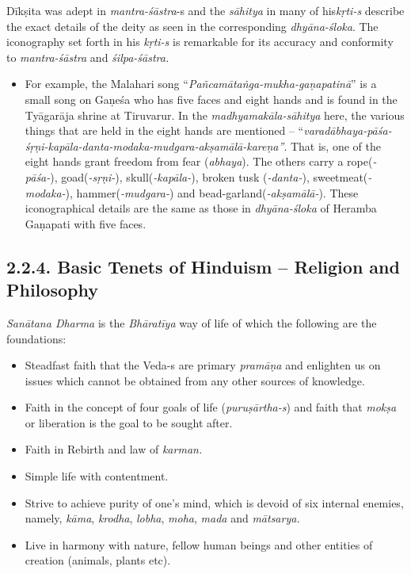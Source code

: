 Dīkṣita was adept in \textit{mantra-śāstra}-s and the \textit{sāhitya} in many of his\break \textit{kṛti-s} describe the exact details of the deity as seen in the corresponding \textit{dhyāna-śloka}. The iconography set forth in his \textit{kṛti-s} is remarkable for its accuracy and conformity to \textit{mantra-śāstra} and \textit{śilpa-śāstra.}

\begin{itemize}
\item For example, the Malahari song “\textit{Pañcamātaṅga-mukha-gaṇapa\-tinā}” is a small song on Gaṇeśa who has five faces and eight hands and is found in the Tyāgarāja shrine at Tiruvarur. In the \textit{madhyamakāla-sāhitya} here, the various things that are held in the eight hands are mentioned – “\textit{varadābhaya-pāśa-śṛṇi-kapāla-danta-modaka-mudgara-akṣamālā-kareṇa”}. That is, one of the eight hands grant freedom from fear (\textit{abhaya}). The others carry a rope(\textit{-pāśa-}), goad(\textit{-sṛṇi-}), skull(\textit{-kapāla-}), broken tusk (\textit{-danta-}), sweetmeat(\textit{-modaka-}), hammer(\textit{-mudgara-}) and bead-garland(\textit{-akṣamālā-}). These iconographical details are the same as those in \textit{dhyāna-śloka} of Heramba Gaṇapati with five faces.

\end{itemize}



\subsection*{2.2.4. Basic Tenets of Hinduism – Religion and Philosophy}

\textit{Sanātana Dharma} is the \textit{Bhāratīya} way of life of which the following are the foundations:

\vspace{-.4cm}

\begin{itemize}
\itemsep=0pt
\item Steadfast faith that the Veda-s are primary \textit{pramāṇa} and enlighten us on issues which cannot be obtained from any other sources of knowledge.

 \item Faith in the concept of four goals of life (\textit{puruṣārtha-s}) and faith that \textit{mokṣa} or liberation is the goal to be sought after.

 \item Faith in Rebirth and law of \textit{karman.}

 \item Simple life with contentment.

 \item Strive to achieve purity of one’s mind, which is devoid of six internal enemies, namely, \textit{kāma}, \textit{krodha}, \textit{lobha}, \textit{moha}, \textit{mada} and \textit{mātsarya.}

 \item Live in harmony with nature, fellow human beings and other entities of creation (animals, plants etc).

\end{itemize}


